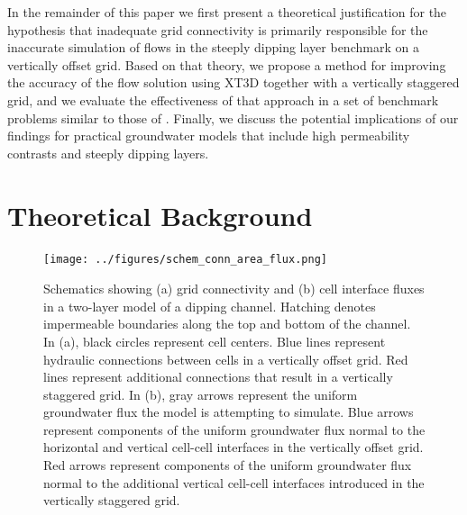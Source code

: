 \documentclass{article}
\begin{document}
In the remainder of this paper we first present a theoretical justification for the hypothesis that inadequate grid connectivity is primarily responsible for the inaccurate simulation of flows in the steeply dipping layer benchmark on a vertically offset grid. Based on that theory, we propose a method for improving the accuracy of the flow solution using XT3D together with a vertically staggered grid, and we evaluate the effectiveness of that approach in a set of benchmark problems similar to those of \cite{bardot2022}. Finally, we discuss the potential implications of our findings for practical groundwater models that include high permeability contrasts and steeply dipping layers.

\section{Theoretical Background}

\begin{figure}
	\begin{center}
	\texttt{[image: ../figures/schem\_conn\_area\_flux.png]}
	\caption{Schematics showing (a) grid connectivity and (b) cell interface fluxes in a two-layer model of a dipping channel. Hatching denotes impermeable boundaries along the top and bottom of the channel. In (a), black circles represent cell centers. Blue lines represent hydraulic connections between cells in a vertically offset grid. Red lines represent additional connections that result in a vertically staggered grid. In (b), gray arrows represent the uniform groundwater flux the model is attempting to simulate. Blue arrows represent components of the uniform groundwater flux normal to the horizontal and vertical cell-cell interfaces in the vertically offset grid. Red arrows represent components of the uniform groundwater flux normal to the additional vertical cell-cell interfaces introduced in the vertically staggered grid.}
	\label{fig:schem-conn-area-flux}
	\end{center}
\end{figure}
\end{document}
